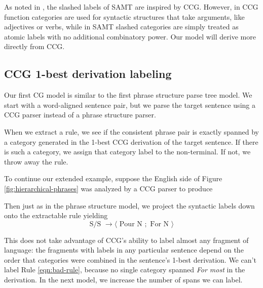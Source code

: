 \documentclass[a4paper]{article}
\begin{document}
As noted in , the slashed labels of SAMT are inspired by CCG. However, in CCG function categories are used for syntactic structures that take arguments, like adjectives or verbs, while in SAMT slashed categories are simply treated as atomic labels with no additional combinatory power. Our model will derive more directly from CCG.

\subsection{CCG 1-best derivation labeling}
\label{sec:ccg-1-best}

Our first CG model is similar to the first phrase structure parse tree model. We start with a word-aligned sentence pair, but we parse the target sentence using a CCG parser instead of a phrase structure parser.

When we extract a rule, we see if the consistent phrase pair is exactly spanned by a category generated in the 1-best CCG derivation of the target sentence. If there is such a category, we assign that category label to the non-terminal. If not, we throw away the rule.

To continue our extended example, suppose the English side of Figure \ref{fig:hierarchical-phrases} was analyzed by a CCG parser to produce
\begin{center}
\end{center}
Then just as in the phrase structure model, we project the syntactic labels down onto the extractable rule yielding
\begin{equation}
\label{eqn:ccg-rule}
\textrm{S/S } \to \langle \textrm{ Pour N }; \textrm{ For N } \rangle
\end{equation}

This does not take advantage of CCG's ability to label almost any fragment of language: the fragments with labels in any particular sentence depend on the order that categories were combined in the sentence's 1-best derivation.  We can't label Rule \ref{eqn:bad-rule}, because no single category spanned {\em For most} in the derivation. In the next model, we increase the number of spans we can label.
\end{document}
